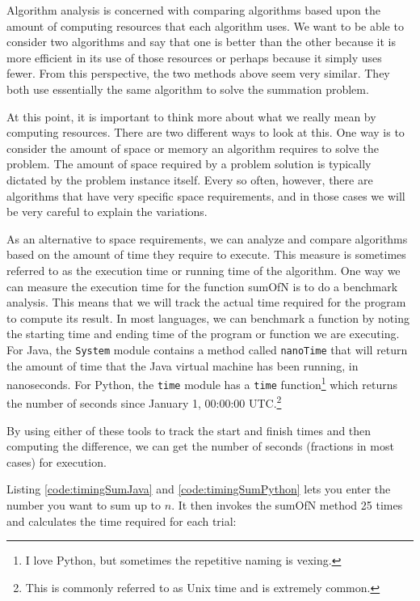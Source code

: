 Algorithm analysis is concerned with comparing algorithms based upon the amount of computing resources that each algorithm uses. 
We want to be able to consider two algorithms and say that one is better than the other because it is more efficient in its use of those resources or perhaps because it simply uses fewer. From this perspective, the two methods above seem very similar. They both use essentially the same algorithm to solve the summation problem.

At this point, it is important to think more about what we really mean by computing resources. There are two different ways to look at this. One way is to consider the amount of space or memory an algorithm requires to solve the problem. The amount of space required by a problem solution is typically dictated by the problem instance itself. Every so often, however, there are algorithms that have very specific space requirements, and in those cases we will be very careful to explain the variations.

As an alternative to space requirements, we can analyze and compare algorithms based on the amount of time they require to execute. This measure is sometimes referred to as the execution time or running time of the algorithm. One way we can measure the execution time for the function sumOfN is to do a benchmark analysis. This means that we will track the actual time required for the program to compute its result. 
In most languages, we can benchmark a function by noting the starting time and ending time of the program or function we are executing. 
For Java, the \texttt{System} module contains a method called \texttt{nanoTime} that will return the amount of time that the Java virtual machine has been running, in nanoseconds. 
For Python, the \texttt{time} module has a \texttt{time} function\footnote{I love Python, but sometimes the repetitive naming is vexing.} which returns the number of seconds since January 1, 00:00:00 UTC.\footnote{This is commonly  referred to as Unix time and is extremely common.}

By using either of these tools to track the start and finish times and then computing the difference, we can get the number of seconds (fractions in most cases) for execution.

Listing \ref{code:timingSumJava} and \ref{code:timingSumPython} lets you enter the number you want to sum up to $n$. It then invokes the sumOfN method 25 times and calculates the time required for each trial:

